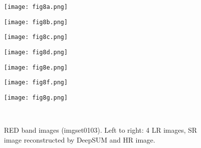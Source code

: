 \documentclass[journal]{IEEEtran}
\begin{document}
\begin{figure*}[t]
  \centering
    \begin{minipage}[b]{\textwidth}
        \begin{minipage}[c]{0.15\textwidth}
        \texttt{[image: fig8a.png]}
        \end{minipage}
        \hfill
        \begin{minipage}[c]{0.15\textwidth}
        \texttt{[image: fig8b.png]}
        \end{minipage}
        \hfill
        \begin{minipage}[c]{0.15\textwidth}
        \texttt{[image: fig8c.png]}
        \end{minipage}
        \hfill
        \begin{minipage}[c]{0.15\textwidth}
        \texttt{[image: fig8d.png]}
        \end{minipage}
        \hfill
        \begin{minipage}[c]{0.15\textwidth}
        \texttt{[image: fig8e.png]}
        \end{minipage}
        \hfill
        \begin{minipage}[c]{0.15\textwidth}
        \texttt{[image: fig8f.png]}
        \end{minipage}
        \hfill
        \begin{minipage}[c]{0.041\textwidth}
        \texttt{[image: fig8g.png]}
        \end{minipage}
        
    \end{minipage}\\
\caption{RED band images (imgset0103). Left to right: 4 LR images, SR image reconstructed by DeepSUM and HR image.}
  \label{fig:many_lr_red}
\end{figure*}
\end{document}
